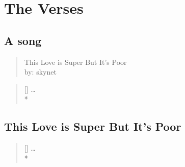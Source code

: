 \documentclass[oneside,11pt]{memoir} %
\begin{document}

\part{The Verses}


\chapter{A song}
\begin{quote} %
    This Love is Super But It's Poor\\ %
    by: skynet
\end{quote}
\settowidth{\versewidth}{This Love is Super But It's Poor} %
\begin{verse}[\versewidth]
\ldots \\*

\end{verse}

\chapter{This Love is Super But It's Poor} %
\settowidth{\versewidth}{A song, a song!}
\begin{verse}[\versewidth]
\ldots \\*

\end{verse}
\end{document}
